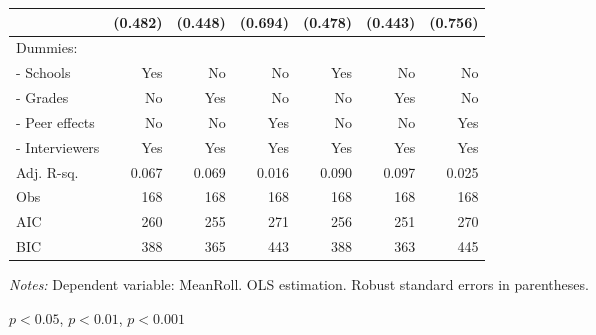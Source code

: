 \begin{table}[htbp]
\begin{adjustbox}{width=1\textwidth}
\begin{threeparttable}
\begin{tabular}{l*{6}{D{.}{.}{-1}}}
                    &             (0.482)   &             (0.448)   &             (0.694)   &             (0.478)   &             (0.443)   &             (0.756)   \\ \midrule
Dummies: &&&&& \\                    
- Schools             &                 Yes   &                  No   &                  No   &                 Yes   &                  No   &                  No   \\
- Grades              &                  No   &                 Yes   &                  No   &                  No   &                 Yes   &                  No   \\
- Peer effects        &                  No   &                  No   &                 Yes   &                  No   &                  No   &                 Yes   \\
- Interviewers        &                 Yes   &                 Yes   &                 Yes   &                 Yes   &                 Yes   &                 Yes   \\
\midrule
Adj. R-sq.          &               0.067   &               0.069   &               0.016   &               0.090   &               0.097   &               0.025   \\
Obs                 &                 168   &                 168   &                 168   &                 168   &                 168   &                 168   \\
AIC                 &                 260   &                 255   &                 271   &                 256   &                 251   &                 270   \\
BIC                 &                 388   &                 365   &                 443   &                 388   &                 363   &                 445   \\
\bottomrule
\end{tabular}
\begin{tablenotes}
\footnotesize
\item \textit{Notes:} Dependent variable: MeanRoll. OLS estimation. Robust standard errors in parentheses. \\
\item \sym{*} \(p<0.05\), \sym{**} \(p<0.01\), \sym{***} \(p<0.001\)
\end{tablenotes}
\end{threeparttable}
\end{adjustbox}
\label{tab:cheat_math}
\end{table}
